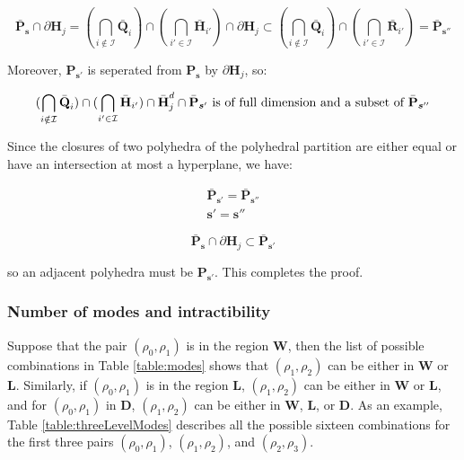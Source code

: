 \begin{equation}
\bar{\textbf{P}}_{\boldsymbol s}\cap \partial \textbf{H}_{j}=(\bigcap_{i\notin \mathcal{I}} \bar{\textbf{Q}}_{i})\cap(\bigcap_{i'\in \mathcal{I}}\bar{\textbf{H}}_{i'})\cap\partial \textbf{H}_{j}\subset (\bigcap_{i\notin \mathcal{I}} \bar{\textbf{Q}}_{i})\cap (\bigcap_{i'\in \mathcal{I}}\bar{\textbf{R}}_{i'})=\bar{\textbf{P}}_{\boldsymbol s''}
\label{eq:adjacency3}
\end{equation}

\noindent Moreover, $\textbf{P}_{\boldsymbol s'}$ is seperated from $\textbf{P}_{\boldsymbol s}$ by $\partial \textbf{H}_{j}$, so:

\begin{equation}
(\bigcap_{i\notin \mathcal{I}} \bar{\textbf{Q}}_{i})\cap(\bigcap_{i'\in \mathcal{I}}\bar{\textbf{H}}_{i'})\cap\bar{\textbf{H}}^{d}_{j}\cap \bar{\textbf{P}}_{\boldsymbol s'} \text{ is of full dimension and a subset of }\bar{\textbf{P}}_{\boldsymbol s''}\\
\label{eq:adjacency4}
\end{equation}

\noindent Since the closures of two polyhedra of the polyhedral partition are either equal or have an intersection at most a hyperplane, we have:

\begin{equation}
\begin{array}{l}
\bar{\textbf{P}}_{\boldsymbol s'}=\bar{\textbf{P}}_{\boldsymbol s''}\\
\boldsymbol s'=\boldsymbol s''
\end{array}
\label{eq:adjacency5}
\end{equation}

\begin{equation}
\bar{\textbf{P}}_{\boldsymbol s}\cap \partial \textbf{H}_{j}\subset \bar{\textbf{P}}_{\boldsymbol s'}
\label{eq:adjacency6}
\end{equation}

\noindent so an adjacent polyhedra must be $\textbf{P}_{\boldsymbol s'}$. This completes the proof.


\subsubsection{Number of modes and intractibility}\label{sec:modes}

Suppose that the pair $(\rho_{0},\rho_{1})$ is in the region \textbf{W}, then the list of possible combinations in Table \ref{table:modes} shows that $(\rho_{1},\rho_{2})$ can be either in \textbf{W} or \textbf{L}. Similarly, if $(\rho_{0},\rho_{1})$ is in the region \textbf{L}, $(\rho_{1},\rho_{2})$ can be either in \textbf{W} or \textbf{L}, and for $(\rho_{0},\rho_{1})$ in \textbf{D}, $(\rho_{1},\rho_{2})$ can be either in \textbf{W}, \textbf{L}, or \textbf{D}. As an example, Table \ref{table:threeLevelModes} describes all the possible sixteen combinations for the first three pairs $(\rho_{0},\rho_{1})$, $(\rho_{1},\rho_{2})$, and $(\rho_{2},\rho_{3})$.

